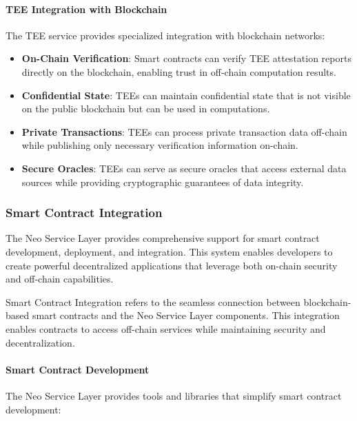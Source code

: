 \paragraph{TEE Integration with Blockchain}
The TEE service provides specialized integration with blockchain networks:

\begin{itemize}
    \item \textbf{On-Chain Verification}: Smart contracts can verify TEE attestation reports directly on the blockchain, enabling trust in off-chain computation results.
    
    \item \textbf{Confidential State}: TEEs can maintain confidential state that is not visible on the public blockchain but can be used in computations.
    
    \item \textbf{Private Transactions}: TEEs can process private transaction data off-chain while publishing only necessary verification information on-chain.
    
    \item \textbf{Secure Oracles}: TEEs can serve as secure oracles that access external data sources while providing cryptographic guarantees of data integrity.
\end{itemize}

\subsubsection{Smart Contract Integration}
\label{subsubsec:smart-contract}

The Neo Service Layer provides comprehensive support for smart contract development, deployment, and integration. This system enables developers to create powerful decentralized applications that leverage both on-chain security and off-chain capabilities.



\begin{definition}
Smart Contract Integration refers to the seamless connection between blockchain-based smart contracts and the Neo Service Layer components. This integration enables contracts to access off-chain services while maintaining security and decentralization.
\end{definition}

\paragraph{Smart Contract Development}
The Neo Service Layer provides tools and libraries that simplify smart contract development:

